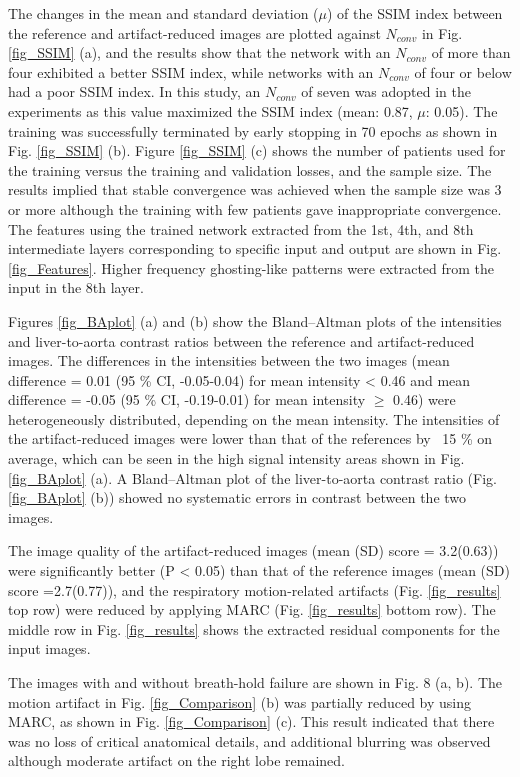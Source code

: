 \documentclass[num-refs]{wiley-article}
\begin{document}
The changes in the mean and standard deviation ($\mu$) of the SSIM index between the reference and artifact-reduced images are plotted against $N_{conv}$ in Fig. \ref{fig_SSIM} (a), and the results show that the network with an $N_{conv}$ of more than four exhibited a better SSIM index, while networks with an $N_{conv}$ of four or below had a poor SSIM index. In this study, an $N_{conv}$ of seven was adopted in the experiments as this value maximized the SSIM index (mean: 0.87, $\mu$: 0.05). The training was successfully terminated by early stopping in 70 epochs as shown in Fig. \ref{fig_SSIM} (b). Figure \ref{fig_SSIM} (c) shows the number of patients used for the training versus the training and validation losses, and the sample size. The results implied that stable convergence was achieved when the sample size was 3 or more although the training with few patients gave inappropriate convergence. The features using the trained network extracted from the 1st, 4th, and 8th intermediate layers corresponding to specific input and output are shown in Fig. \ref{fig_Features}. Higher frequency ghosting-like patterns were extracted from the input in the 8th layer. 

Figures \ref{fig_BAplot} (a) and (b) show the Bland–Altman plots of the intensities and liver-to-aorta contrast ratios between the reference and artifact-reduced images. The differences in the intensities between the two images (mean difference = 0.01 (95 \% CI, -0.05-0.04) for mean intensity < 0.46 and mean difference = -0.05 (95 \% CI, -0.19-0.01) for mean intensity $\geq$ 0.46) were heterogeneously distributed, depending on the mean intensity. The intensities of the artifact-reduced images were lower than that of the references by ~15 \% on average, which can be seen in the high signal intensity areas shown in Fig. \ref{fig_BAplot} (a). A Bland–Altman plot of the liver-to-aorta contrast ratio (Fig. \ref{fig_BAplot} (b)) showed no systematic errors in contrast between the two images. 

The image quality of the artifact-reduced images (mean (SD) score = 3.2(0.63)) were significantly better (P < 0.05) than that of the reference images (mean (SD) score =2.7(0.77)), and the respiratory motion-related artifacts (Fig. \ref{fig_results} top row) were reduced by applying MARC (Fig. \ref{fig_results} bottom row). The middle row in Fig. \ref{fig_results} shows the extracted residual components for the input images.

The images with and without breath-hold failure are shown in Fig. 8 (a, b). The motion artifact in Fig. \ref{fig_Comparison} (b) was partially reduced by using MARC, as shown in Fig. \ref{fig_Comparison} (c). This result indicated that there was no loss of critical anatomical details, and additional blurring was observed although moderate artifact on the right lobe remained. 
\end{document}
